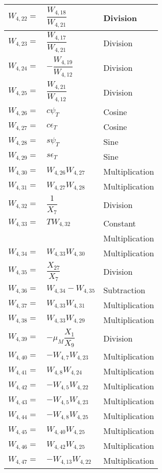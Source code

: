 \begin{longtable}{|p{1.5cm}|l|p{2cm}|}
$W_{4,22}=$ & $ \dfrac{W_{4,18}}{W_{4,21}} $ & Division \\ \hline
$W_{4,23}=$ & $ \dfrac{W_{4,17}}{W_{4,21}} $ & Division \\ \hline
$W_{4,24}=$ & $ -\dfrac{W_{4,19}}{W_{4,12}} $ & Division \\ \hline
$W_{4,25}=$ & $ \dfrac{W_{4,21}}{W_{4,12}} $ & Division \\ \hline
$W_{4,26}=$ & $ c\psi_{T} $ & Cosine \\ \hline
$W_{4,27}=$ & $ c\epsilon_{T} $ & Cosine \\ \hline
$W_{4,28}=$ & $ s\psi_{T} $ & Sine \\ \hline
$W_{4,29}=$ & $ s\epsilon_{T} $ & Sine \\ \hline
$W_{4,30}=$ & $ W_{4,26}W_{4,27} $ & Multiplication \\ \hline
$W_{4,31}=$ & $ W_{4,27}W_{4,28} $ & Multiplication \\ \hline
$W_{4,32}=$ & $ \dfrac{1}{X_{7}} $ & Division \\ \hline
$W_{4,33}=$ & $ T W_{4,32} $ & Constant  \\ 
& & Multiplication \\ \hline
$W_{4,34}=$ & $ W_{4,33}W_{4,30} $ & Multiplication \\ \hline
$W_{4,35}=$ & $ \dfrac{X_{27}}{X_{7}} $ & Division \\ \hline
$W_{4,36}=$ & $ W_{4,34}-W_{4,35} $ & Subtraction \\ \hline
$W_{4,37}=$ & $ W_{4,33}W_{4,31} $ & Multiplication \\ \hline
$W_{4,38}=$ & $ W_{4,33}W_{4,29} $ & Multiplication \\ \hline
$W_{4,39}=$ & $ -\mu_{M}\dfrac{X_{1}}{X_{9}} $ & Division \\ \hline
$W_{4,40}=$ & $ -W_{4,7}W_{4,23} $ & Multiplication \\ \hline
$W_{4,41}=$ & $ W_{4,8}W_{4,24} $ & Multiplication \\ \hline
$W_{4,42}=$ & $ -W_{4,5}W_{4,22} $ & Multiplication \\ \hline
$W_{4,43}=$ & $ -W_{4,5}W_{4,23} $ & Multiplication \\ \hline
$W_{4,44}=$ & $ -W_{4,8}W_{4,25} $ & Multiplication \\ \hline
$W_{4,45}=$ & $ W_{4,40}W_{4,25} $ & Multiplication \\ \hline
$W_{4,46}=$ & $ W_{4,42}W_{4,25} $ & Multiplication \\ \hline
$W_{4,47}=$ & $ -W_{4,13}W_{4,22} $ & Multiplication \\ \hline

\end{longtable}
